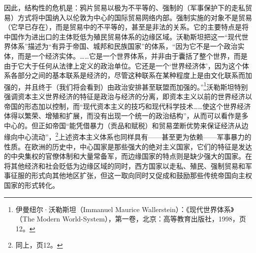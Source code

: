 \documentclass[a4paper, 12pt, openright]{ctexbook}
\begin{document}
因此，结构性的危机是：鸦片贸易以极为不平等的、强制的（军事保护下的走私贸易）方式将中国纳入以伦敦为中心的国际贸易网络内部。强制实施的对象不是贸易（它早已存在），而是贸易中的不平等的，甚至是非法的关系。它的主要特点是将中国作为进出口的主体贬低为殖民贸易体系的边缘区域。沃勒斯坦把这一“现代世界体系”描述为“有异于帝国、城邦和民族国家”的体系，“因为它不是一个政治实体，而是一个经济实体。……它是一个世界体系，并非由于囊括了整个世界，而是由于它大于任何从法律上定义的政治单位。它还是一个‘世界经济体’，因为这个体系各部分之间的基本联系是经济的，尽管这种联系在某种程度上是由文化联系而加强的，并且终于（我们将会看到）由政治安排甚至联盟而加强的。”\footnote{伊曼纽尔·沃勒斯坦（Immanuel Maurice Wallerstein）：《现代世界体系》（The Modern World-System），第一卷，北京：高等教育出版社，1998，页12。}沃勒斯坦特别强调资本主义世界经济的特征是政治与经济的分离，即资本主义以前的世界经济以帝国的形态加以控制，而“现代资本主义的技巧和现代科学技术……使这个世界经济体得以繁荣、增殖和扩展，而没有出现一个统一的政治结构”，从而可以看作是多中心的。但正如帝国“能凭借暴力（贡品和赋税）和贸易垄断优势来保证经济从边缘向中心流动”，\footnote{同上，页12。}上述资本主义体系也同样具有——甚至更为依赖——军事暴力的性质。在欧洲的历史中，中心国家是那些强大的绝对主义国家，它们的特征是发达的中央集权的官僚体制和大量常备军，而边缘国家的特点则是缺少强大的国家。在将其他经济和社会贬低为边缘区域的同时，西方国家以走私、殖民、强制贸易和军事征服的形式向其他地区扩张，但这一取向同时又促成和鼓励那些传统帝国向主权国家的形式转化。
\end{document}
